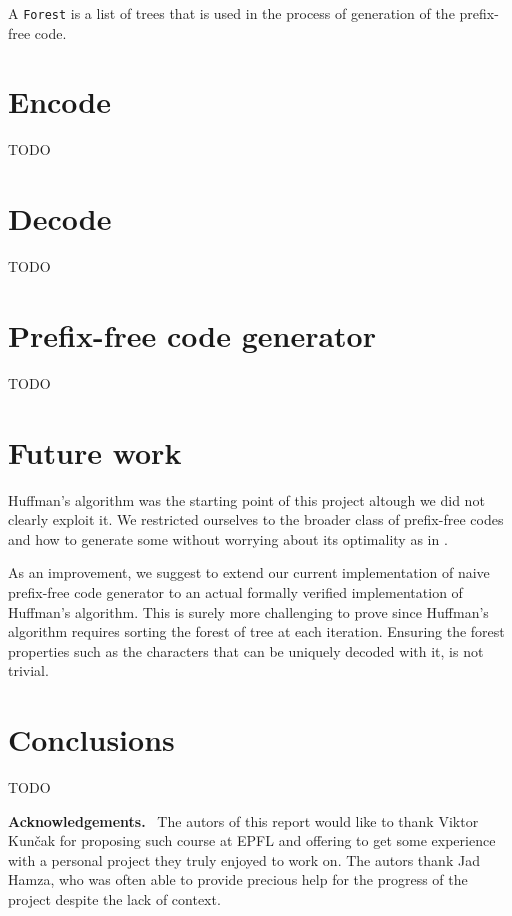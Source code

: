 \documentclass[a4paper,UKenglish,cleveref, autoref, thm-restate]{lipics-v2021}
\begin{document}
A \lstinline{Forest} is a list of trees that is used in the process of generation of the prefix-free code.

\section{Encode} %

TODO

\section{Decode} %

TODO

\section{Prefix-free code generator} %

TODO

\section{Future work} %

Huffman's algorithm was the starting point of this project altough we did not clearly exploit it. We restricted ourselves to the broader class of prefix-free codes and how to generate some without worrying about its optimality as in \cite{blanchette}. 

As an improvement, we suggest to extend our current implementation of naive prefix-free code generator to an actual formally verified implementation of Huffman's algorithm. This is surely more challenging to prove since Huffman's algorithm requires sorting the forest of tree at each iteration. Ensuring the forest properties such as the characters that can be uniquely decoded with it, is not trivial.

\section{Conclusions} %

TODO

\vspace{0.5cm} %
\noindent %
\textbf{\large Acknowledgements.}\ %
The autors of this report would like to thank Viktor Kun\v{c}ak for proposing such course at EPFL and offering to get some experience with a personal project they truly enjoyed to work on. The autors thank Jad Hamza, who was often able to provide precious help for the progress of the project despite the lack of context.


\end{document}
